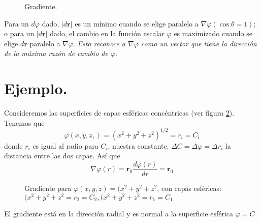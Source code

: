\begin{figure}[H]
\centering

\label{fig:figura_02}
\caption{Gradiente.}
\end{figure}
Para un $d \varphi$ dado, $\vert d \mathbf{r} \vert$ es un mínimo cuando se elige paralelo a $\nabla \varphi (\cos \theta =1)$; o para un $\vert d \mathbf{r} \vert$ dado, el cambio en la función escalar $\varphi$ es maximizado cuando se elige $d \mathbf{r}$ paralelo a $\nabla \varphi$. \emph{Esto reconoce a $\nabla \varphi$ como un vector que tiene la dirección de la máxima razón de cambio de $\varphi$}.
\section*{Ejemplo.}
Consideremos las superficies de capas esféricas concéntricas (ver figura \ref{fig:figura_03}). Tenemos que
\[ \varphi (x,y,z,) = (x^{2} + y^{2} + z^{2})^{1/2} = r_{i} = C_{i} \]
donde $r_{i}$ es igual al radio para $C_{i}$, nuestra constante. $\Delta C = \Delta \varphi = \Delta r_{i}$ la distancia entre las dos capas. Así que
\[ \nabla \varphi (r) = \mathbf{r}_{0} \dfrac{d \varphi (r)}{d r} = \mathbf{r}_{0} \]
\begin{figure}[H]
\centering

\label{fig:figura_03}
\caption{Gradiente para $\varphi(x,y,z) = (x^{2}+y^{2}+z^{2}$, con capas esféricas: $(x^{2}+y^{2}+z^{2} = r_{2} = C_{2},(x^{2}+y^{2}+z^{2} = r_{1} = C_{1}$}
\end{figure}
El gradiente está en la dirección radial y es normal a la superficie esférica $\varphi = C$


